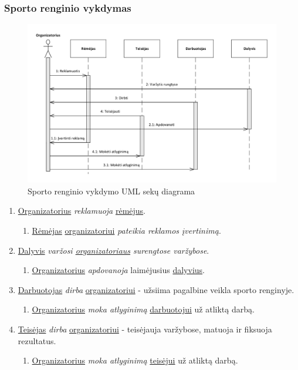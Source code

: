 \documentclass{VUMIFPSkursinis}
\begin{document}
    \subsubsection*{Sporto renginio vykdymas}
      \begin{figure}[H]
        \centering
        \includegraphics[width=\textwidth]{img/SekuDiagrama3}
        \caption{Sporto renginio vykdymo UML sekų diagrama}
        \label{fig:vykdymoSekuDiagrama}
      \end{figure}
      \begin{enumerate}
        \item \underline{Organizatorius} \textit{reklamuoja} \underline{rėmėjus}.
          \begin{enumerate}
            \item \underline{Rėmėjas} \underline{organizatoriui} \textit{pateikia reklamos įvertinimą}.
          \end{enumerate}
        \item \underline{Dalyvis} \textit{varžosi \underline{organizatoriaus} surengtose varžybose}.
          \begin{enumerate}
            \item \underline{Organizatorius} \textit{apdovanoja} laimėjusius \underline{dalyvius}.
          \end{enumerate}
        \item \underline{Darbuotojas} \textit{dirba} \underline{organizatoriui} - užsiima pagalbine veikla sporto renginyje.
          \begin{enumerate}
            \item \underline{Organizatorius} \textit{moka atlyginimą} \underline{darbuotojui} už atliktą darbą.
          \end{enumerate}
        \item \underline{Teisėjas} \textit{dirba} \underline{organizatoriui} - teisėjauja varžybose, matuoja ir fiksuoja rezultatus.
          \begin{enumerate}
            \item \underline{Organizatorius} \textit{moka atlyginimą} \underline{teisėjui} už atliktą darbą.
          \end{enumerate} 
      \end{enumerate}
\end{document}
